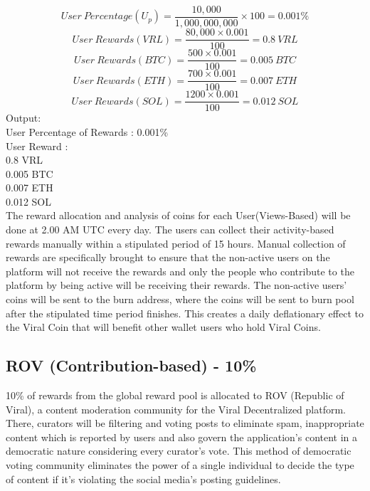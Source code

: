 \documentclass[10pt]{article}
\begin{document}
\begin{equation}
User\:Percentage(U_p)=\frac{10,000}{1,000,000,000} \times 100 = 0.001\%
\end{equation}
\begin{equation}
User\:Rewards(VRL)=\frac{80,000 \times 0.001}{100} = 0.8\:VRL
\end{equation}
\begin{equation}
User\:Rewards(BTC)=\frac{500 \times 0.001}{100} = 0.005\:BTC
\end{equation}
\begin{equation}
User\:Rewards(ETH)=\frac{700 \times 0.001}{100} = 0.007\:ETH
\end{equation}
\begin{equation}
User\:Rewards(SOL)=\frac{1200 \times 0.001}{100} = 0.012\:SOL
\end{equation}
Output:\\

User Percentage of Rewards : 0.001\%\\
User Reward : \\
0.8 VRL \\
0.005 BTC \\
0.007 ETH \\
0.012 SOL\\


The reward allocation and analysis of coins for each User(Views-Based) will be done at 2.00 AM UTC every day. The users can collect their activity-based rewards manually within a stipulated period of 15 hours. Manual collection of rewards are specifically brought to ensure that the non-active users on the platform will not receive the rewards and only the people who contribute to the platform by being active will be receiving their rewards. The non-active users' coins will be sent to the burn address, where the coins will be sent to burn pool after the stipulated time period finishes. This creates a daily deflationary effect to the Viral Coin that will benefit other wallet users who hold Viral Coins.\\

\subsection{ROV (Contribution-based) - 10\%}

10\% of rewards from the global reward pool is allocated to ROV (Republic of Viral), a content moderation community for the Viral Decentralized platform. There, curators will be filtering and voting posts to eliminate spam, inappropriate content which is reported by users and also govern the application's content in a democratic nature considering every curator's vote. This method of democratic voting community eliminates the power of a single individual to decide the type of content if it's violating the social media's posting guidelines. \\
\end{document}
